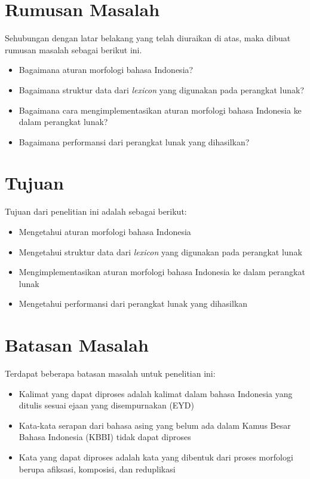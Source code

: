 

\section{Rumusan Masalah}
\label{sec:rumusanMasalah}

Sehubungan dengan latar belakang yang telah diuraikan di atas, maka dibuat rumusan masalah sebagai berikut ini.
\begin{itemize}
	\item Bagaimana aturan morfologi bahasa Indonesia?
	\item Bagaimana struktur data dari {\it lexicon} yang digunakan pada perangkat lunak?
	\item Bagaimana cara mengimplementasikan aturan morfologi bahasa Indonesia ke dalam perangkat lunak?
	\item Bagaimana performansi dari perangkat lunak yang dihasilkan?
\end{itemize}

\section{Tujuan}
\label{sec:tujuan}

Tujuan dari penelitian ini adalah sebagai berikut:
\begin{itemize}
	\item Mengetahui aturan morfologi bahasa Indonesia
	\item Mengetahui struktur data dari {\it lexicon} yang digunakan pada perangkat lunak
	\item Mengimplementasikan aturan morfologi bahasa Indonesia ke dalam perangkat lunak
	\item Mengetahui performansi dari perangkat lunak yang dihasilkan
\end{itemize}

\section{Batasan Masalah}
\label{sec:batasanMasalah}

Terdapat beberapa batasan masalah untuk penelitian ini:

\begin{itemize}
	\item Kalimat yang dapat diproses adalah kalimat dalam bahasa Indonesia yang ditulis sesuai ejaan yang disempurnakan (EYD)
	\item Kata-kata serapan dari bahasa asing yang belum ada dalam Kamus Besar Bahasa Indonesia (KBBI) tidak dapat diproses
	\item Kata yang dapat diproses adalah kata yang dibentuk dari proses morfologi berupa afiksasi, komposisi, dan reduplikasi
\end{itemize}

